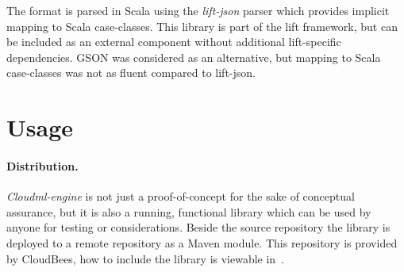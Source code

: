 The  format is parsed in Scala using the \emph{lift-json} parser which provides implicit
mapping to Scala case-classes. This library is part of the lift framework,
but can be included as an external component without additional lift-specific dependencies.
GSON was considered as an alternative, but mapping to Scala case-classes was not as 
fluent compared to lift-json.

\section{Usage}



\paragraph{Distribution.}

\emph{Cloudml-engine} is not just a proof-of-concept for the sake of conceptual assurance, but it is 
also a running, functional library which can be used by anyone for testing or considerations.
Beside the source repository\cite{cloudml-engine} the library is deployed to a remote repository
\cite{cloudbees-cloudml-engine} as a Maven module.
This repository is provided by CloudBees, 
how to include the library is viewable in~.
